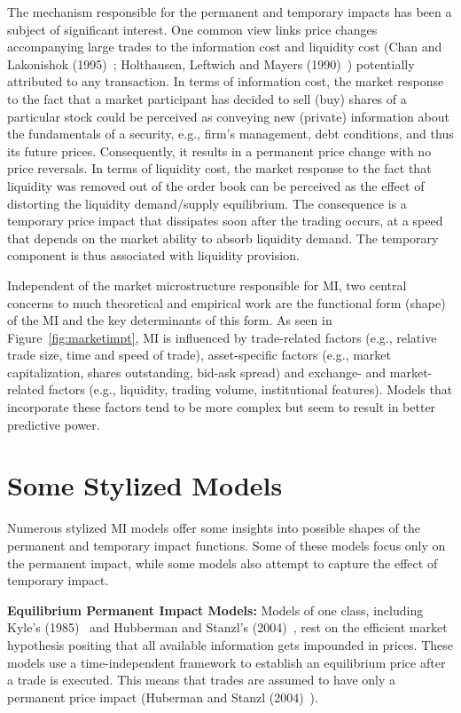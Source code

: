 The mechanism responsible for the permanent and temporary impacts has been a subject of significant interest. One common view links price changes accompanying large trades to the information cost and liquidity cost (Chan and Lakonishok (1995)~\cite{chan1995}; Holthausen, Leftwich and Mayers (1990)~\cite{holthausen1990}) potentially attributed to any transaction. In terms of information cost, the market response to the fact that a market participant has decided to sell (buy) shares of a particular stock could be perceived as conveying new (private) information about the fundamentals of a security, e.g., firm's management, debt conditions, and thus its future prices. Consequently, it results in a permanent price change with no price reversals. In terms of liquidity cost, the market response to the fact that liquidity was removed out of the order book can be perceived as the effect of distorting the liquidity demand/supply equilibrium. The consequence is a temporary price impact that dissipates soon after the trading occurs, at a speed that depends on the market ability to absorb liquidity demand. The temporary component is thus associated with liquidity provision. 


Independent of the market microstructure responsible for MI, two central concerns to much theoretical and empirical work are the functional form (shape) of the MI and the key determinants of this form. As seen in Figure~\ref{fig:marketimpt}, MI is influenced by trade-related factors (e.g., relative trade size, time and speed of trade), asset-specific factors (e.g., market capitalization, shares outstanding, bid-ask spread) and exchange- and market-related factors (e.g., liquidity, trading volume, institutional features). Models that incorporate these factors tend to be more complex but seem to result in better predictive power.


\section{Some Stylized Models\label{sec:some_style_model}}\label{in:style9}

Numerous stylized MI models offer some insights into possible shapes of the permanent and temporary impact functions. Some of these models focus only on the permanent impact, while some models also attempt to capture the effect of temporary impact. \twomedskip


\noindent\textbf{Equilibrium Permanent Impact Models:} Models of one class, including Kyle's (1985)~\cite{kyle1985} and Hubberman and Stanzl's (2004)~\cite{huberstan}, rest on the efficient market hypothesis positing that all available information gets impounded in prices. These models use a time-independent framework to establish an equilibrium price after a trade is executed. This means that trades are assumed to have only a permanent price impact (Huberman and Stanzl (2004)~\cite[p.1260]{huberstan}).


